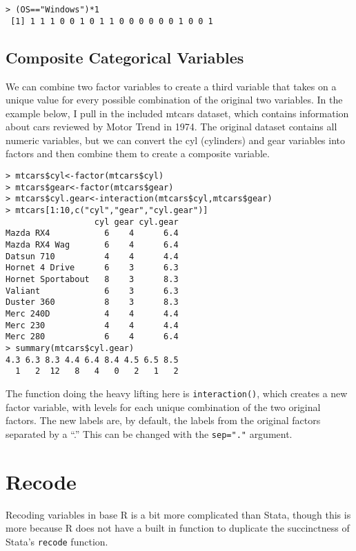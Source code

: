\documentclass[12pt, oneside]{amsart}   	%
\begin{document}
\begin{verbatim}
> (OS=="Windows")*1
 [1] 1 1 1 0 0 1 0 1 1 0 0 0 0 0 0 1 0 0 1
\end{verbatim}

\subsection{Composite Categorical Variables}

We can combine two factor variables to create a third variable that takes on a unique value for every possible combination of the original two variables. In the example below, I pull in the included mtcars dataset, which contains information about cars reviewed by Motor Trend in 1974. The original dataset contains all numeric variables, but we can convert the cyl (cylinders) and gear variables into factors and then combine them to create a composite variable.

\begin{verbatim}
> mtcars$cyl<-factor(mtcars$cyl)
> mtcars$gear<-factor(mtcars$gear)
> mtcars$cyl.gear<-interaction(mtcars$cyl,mtcars$gear)
> mtcars[1:10,c("cyl","gear","cyl.gear")]
                  cyl gear cyl.gear
Mazda RX4           6    4      6.4
Mazda RX4 Wag       6    4      6.4
Datsun 710          4    4      4.4
Hornet 4 Drive      6    3      6.3
Hornet Sportabout   8    3      8.3
Valiant             6    3      6.3
Duster 360          8    3      8.3
Merc 240D           4    4      4.4
Merc 230            4    4      4.4
Merc 280            6    4      6.4
> summary(mtcars$cyl.gear)
4.3 6.3 8.3 4.4 6.4 8.4 4.5 6.5 8.5 
  1   2  12   8   4   0   2   1   2 
\end{verbatim}

The function doing the heavy lifting here is \texttt{interaction()}, which creates a new factor variable, with levels for each unique combination of the two original factors. The new labels are, by default, the labels from the original factors separated by a ``.'' This can be changed with the \texttt{sep="."} argument. 

\section{Recode}

Recoding variables in base R is a bit more complicated than Stata, though this is more because R does not have a built in function to duplicate the succinctness of Stata's \texttt{recode} function. 
\end{document}
